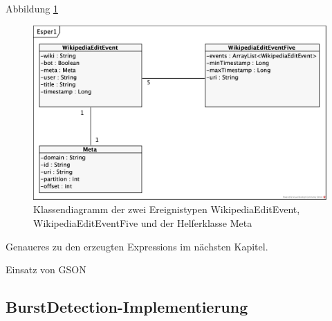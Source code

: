 Abbildung \ref{fig:class_diagram_eventtypes}


\begin{figure}[h]
    \includegraphics[width=.5\textwidth]{images/Esper1.png}
    \caption{Klassendiagramm der zwei Ereignistypen WikipediaEditEvent, WikipediaEditEventFive und der Helferklasse Meta}
    \label{fig:class_diagram_eventtypes}
\end{figure}


Genaueres zu den erzeugten Expressions im nächsten Kapitel.

Einsatz von GSON

\subsection{BurstDetection-Implementierung}